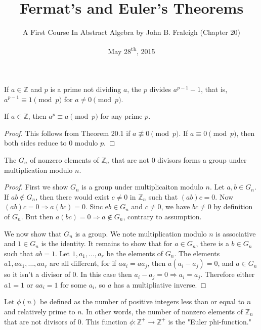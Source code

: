 \documentclass[a4paper,8pt]{article}
\title{Fermat's and Euler's Theorems}
\author{A First Course In Abstract Algebra by John B. Fraleigh (Chapter 20)}
\date{May 28\textsuperscript{th}, 2015}
\begin{document}
\maketitle
{}

\begin{outline}

    If \(a \in \mathbb{Z}\) and \(p\) is a prime not dividing \(a\),
    the \(p\) divides \(a^{p-1}-1\), that is, \(a^{p-1} \equiv 1 \pmod{p}\) for \(a \neq 0 \pmod{p}\).

    If \(a \in \mathbb{Z}\), then \(a^p \equiv a \pmod{p}\) for any prime \(p\).

    \begin{proof}
      This follows from Theorem 20.1 if \(a \not\equiv 0 \pmod{p}\). If \(a \equiv 0 \pmod{p}\), then
      both sides reduce to \(0\) modulo \(p\).
    \end{proof}

    The \(G_n\) of nonzero elements of \(\mathbb{Z}_n\) that are not \(0\) divisors forms a group
    under multiplication modulo \(n\).

    \begin{proof}
      First we show \(G_n\) is a group under multiplicaiton modulo \(n\). Let \(a, b \in G_n\). If \(ab \not\in G_n\),
      then there would exist \(c \neq 0\) in \(\mathbb{Z}_n\) such that \((ab)c = 0\). Now \((ab)c = 0 \Rightarrow a(bc)
      = 0\). Sinc e\(b \in G_n\) and \(c \neq 0\), we have \(bc \neq 0\) by definition of \(G_n\). But then \(a(bc) = 0
      \Rightarrow a \not\in G_n\), contrary to assumption.

      We now show that \(G_n\) is a group. We note multiplication modulo \(n\) is associative and \(1 \in G_n\) is the
      identity. It remains to show that for \(a \in G_n\), there is a \(b \in G_n\) such that \(ab = 1\). Let \(1, a_1,
      \ldots, a_r\) be the elements of \(G_n\). The elements \(a1, aa_1, \ldots, aa_r\) are all different, for if \(aa_i
      = aa_j\), then \(a(a_i-a_j) = 0\), and \(a \in G_n\) so it isn't a divisor of \(0\). In this case then \(a_i-a_j = 0
      \Rightarrow a_i = a_j\). Therefore either \(a1 = 1\) or \(aa_i = 1\) for some \(a_i\), so \(a\) has a multipliative
      inverse.
    \end{proof}

    Let \(\phi(n)\) be defined as the number of positive integers less than or equal to \(n\) and relatively prime
    to \(n\). In other words, the number of nonzero elements of \(\mathbb{Z}_n\) that are not divisors
    of \(0\). This function \(\phi: \mathbb{Z}^{+} \rightarrow \mathbb{Z}^{+}\) is the "Euler phi-function."


\end{outline}
\end{document}
